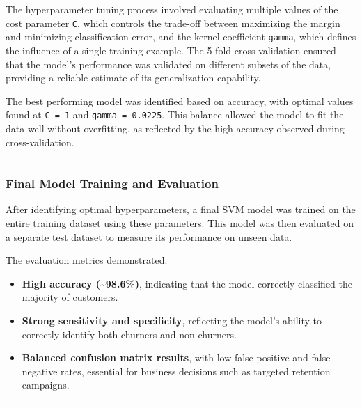 \documentclass[
]{article}
\providecommand{\tightlist}{%
  \setlength{\itemsep}{0pt}\setlength{\parskip}{0pt}}
\begin{document}
The hyperparameter tuning process involved evaluating multiple values of
the cost parameter \texttt{C}, which controls the trade-off between
maximizing the margin and minimizing classification error, and the
kernel coefficient \texttt{gamma}, which defines the influence of a
single training example. The 5-fold cross-validation ensured that the
model's performance was validated on different subsets of the data,
providing a reliable estimate of its generalization capability.

The best performing model was identified based on accuracy, with optimal
values found at \texttt{C\ =\ 1} and \texttt{gamma\ =\ 0.0225}. This
balance allowed the model to fit the data well without overfitting, as
reflected by the high accuracy observed during cross-validation.

\begin{center}\rule{0.5\linewidth}{0.5pt}\end{center}

\hypertarget{final-model-training-and-evaluation}{%
\subsubsection{Final Model Training and
Evaluation}\label{final-model-training-and-evaluation}}

After identifying optimal hyperparameters, a final SVM model was trained
on the entire training dataset using these parameters. This model was
then evaluated on a separate test dataset to measure its performance on
unseen data.

The evaluation metrics demonstrated:

\begin{itemize}
\tightlist
\item
  \textbf{High accuracy (\textasciitilde98.6\%)}, indicating that the
  model correctly classified the majority of customers.
\item
  \textbf{Strong sensitivity and specificity}, reflecting the model's
  ability to correctly identify both churners and non-churners.
\item
  \textbf{Balanced confusion matrix results}, with low false positive
  and false negative rates, essential for business decisions such as
  targeted retention campaigns.
\end{itemize}

\begin{center}\rule{0.5\linewidth}{0.5pt}\end{center}
\end{document}
